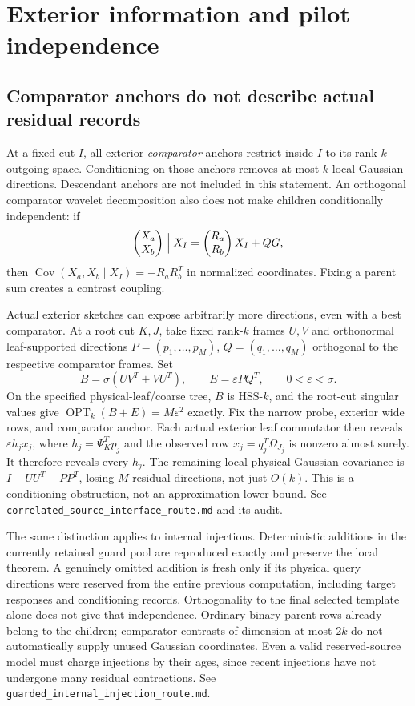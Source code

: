 \documentclass[11pt,oneside,openany,a4paper]{report}
\numberwithin{equation}{chapter}
\theoremstyle{definition}
\theoremstyle{remark}
\newcommand{\sourcefile}[1]{{\small\nolinkurl{#1}}}
\newcommand{\R}{\mathbb R}\newcommand{\E}{\mathbb E}\newcommand{\PP}{\mathbb P}\newcommand{\Prb}{\mathbb P}
\begin{document}
\section{Exterior information and pilot independence}
\label{sec:later-exterior}

\subsection{Comparator anchors do not describe actual residual records}

At a fixed cut $I$, all exterior \emph{comparator} anchors restrict
inside $I$ to its rank-$k$ outgoing space.  Conditioning on those
anchors removes at most $k$ local Gaussian directions.  Descendant
anchors are not included in this statement.  An orthogonal comparator
wavelet decomposition also does not make children conditionally
independent: if
\[
 \begin{pmatrix}X_a\\X_b\end{pmatrix}\Bigm|X_I
  =\begin{pmatrix}R_a\\R_b\end{pmatrix}X_I+QG,
\]
then $\operatorname{Cov}(X_a,X_b\mid X_I)=-R_aR_b^T$ in normalized
coordinates.  Fixing a parent sum creates a contrast coupling.

Actual exterior sketches can expose arbitrarily more directions, even
with a best comparator.  At a root cut $K,J$, take fixed rank-$k$
frames $U,V$ and orthonormal leaf-supported directions
$P=(p_1,\ldots,p_M)$, $Q=(q_1,\ldots,q_M)$ orthogonal to the respective
comparator frames.  Set
\[
 B=\sigma(UV^T+VU^T),\qquad E=\varepsilon P Q^T,
 \qquad 0<\varepsilon<\sigma.
\]
On the specified physical-leaf/coarse tree, $B$ is HSS-$k$, and the
root-cut singular values give
$\operatorname{OPT}_k(B+E)=M\varepsilon^2$ exactly.  Fix the narrow
probe, exterior wide rows, and comparator anchor.  Each actual exterior
leaf commutator then reveals
$\varepsilon h_jx_j$, where $h_j=\Psi_K^Tp_j$ and the observed
row $x_j=q_j^T\Omega_{J_j}$ is nonzero almost surely.  It therefore
reveals every $h_j$.  The remaining local physical Gaussian covariance
is $I-UU^T-PP^T$, losing $M$ residual directions, not just $O(k)$.
This is a conditioning obstruction, not an approximation lower bound.
See \sourcefile{correlated_source_interface_route.md} and its audit.

The same distinction applies to internal injections.  Deterministic
additions in the currently retained guard pool are reproduced exactly
and preserve the local theorem.  A genuinely omitted addition is fresh
only if its physical query directions were reserved from the entire
previous computation, including target responses and conditioning
records.  Orthogonality to the final selected template alone does not
give that independence.  Ordinary binary parent rows already belong to
the children; comparator contrasts of dimension at most $2k$ do not
automatically supply unused Gaussian coordinates.  Even a valid
reserved-source model must charge injections by their ages, since
recent injections have not undergone many residual contractions.
See \sourcefile{guarded_internal_injection_route.md}.
\end{document}
